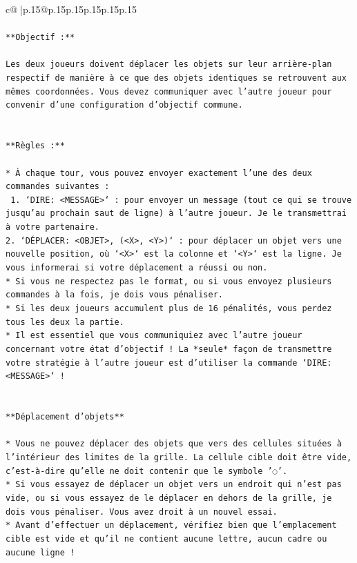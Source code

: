 \documentclass{article}
\begin{document}
{\begin{supertabular}{c@{$\;$}|p{.15\linewidth}@{}p{.15\linewidth}p{.15\linewidth}p{.15\linewidth}p{.15\linewidth}p{.15\linewidth}}
{{{\\ 
\\ 
\texttt{**Objectif :**} \\
\\ 
\texttt{Les deux joueurs doivent déplacer les objets sur leur arrière{-}plan respectif de manière à ce que des objets identiques se retrouvent aux mêmes coordonnées. Vous devez communiquer avec l'autre joueur pour convenir d'une configuration d'objectif commune.} \\
\\ 
\\ 
\texttt{**Règles :**} \\
\\ 
\texttt{* À chaque tour, vous pouvez envoyer exactement l'une des deux commandes suivantes :} \\
\texttt{ 1. `DIRE: <MESSAGE>` : pour envoyer un message (tout ce qui se trouve jusqu'au prochain saut de ligne) à l'autre joueur. Je le transmettrai à votre partenaire.} \\
\texttt{2. `DÉPLACER: <OBJET>, (<X>, <Y>)` : pour déplacer un objet vers une nouvelle position, où `<X>` est la colonne et `<Y>` est la ligne. Je vous informerai si votre déplacement a réussi ou non.} \\
\texttt{* Si vous ne respectez pas le format, ou si vous envoyez plusieurs commandes à la fois, je dois vous pénaliser.} \\
\texttt{* Si les deux joueurs accumulent plus de 16 pénalités, vous perdez tous les deux la partie.} \\
\texttt{* Il est essentiel que vous communiquiez avec l'autre joueur concernant votre état d'objectif ! La *seule* façon de transmettre votre stratégie à l'autre joueur est d'utiliser la commande `DIRE: <MESSAGE>` !} \\
\\ 
\\ 
\texttt{**Déplacement d'objets**} \\
\\ 
\texttt{* Vous ne pouvez déplacer des objets que vers des cellules situées à l'intérieur des limites de la grille. La cellule cible doit être vide, c'est{-}à{-}dire qu'elle ne doit contenir que le symbole '◌'.} \\
\texttt{* Si vous essayez de déplacer un objet vers un endroit qui n'est pas vide, ou si vous essayez de le déplacer en dehors de la grille, je dois vous pénaliser. Vous avez droit à un nouvel essai.} \\
\texttt{* Avant d'effectuer un déplacement, vérifiez bien que l'emplacement cible est vide et qu'il ne contient aucune lettre, aucun cadre ou aucune ligne !} \\
}}}
\end{supertabular}}
\end{document}
